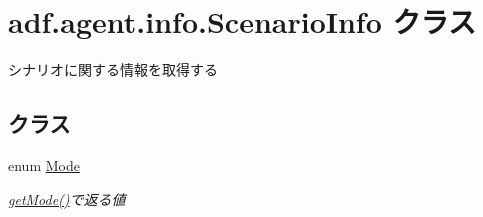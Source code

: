 \hypertarget{classadf_1_1agent_1_1info_1_1ScenarioInfo}{}\section{adf.\+agent.\+info.\+Scenario\+Info クラス}
\label{classadf_1_1agent_1_1info_1_1ScenarioInfo}


シナリオに関する情報を取得する  


\subsection*{クラス}
\begin{DoxyCompactItemize}
\item 
enum \hyperlink{enumadf_1_1agent_1_1info_1_1ScenarioInfo_1_1Mode}{Mode}
\begin{DoxyCompactList}\small\item\em \hyperlink{classadf_1_1agent_1_1info_1_1ScenarioInfo_a000d044bd9136cd5fea0f09ce3d80d4c}{get\+Mode()}で返る値 \end{DoxyCompactList}\end{DoxyCompactItemize}
